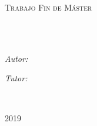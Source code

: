 \documentclass[
11pt, %
spanish,
singlespacing, %
headsepline, %
]{MastersDoctoralThesis} %
\author{\textsc{José María Sánchez Salas}} %
\begin{document}
\nocite{*} %

\frontmatter %

\pagestyle{plain} %


\begin{titlepage}
\begin{center}

\vspace*{.06\textheight}
{\scshape\LARGE \univname\par}\vspace{1cm} %
\vspace{10mm}%
{\scshape\huge \degreename\par} \vspace{0.5cm} %
\textsc{\LARGE Trabajo Fin de Máster}\\[0.5cm] %

\vspace{10mm}
\HRule \\[0.4cm] %
{\huge \bfseries \ttitle\par}\vspace{0.4cm} %
\HRule \\[1.5cm] %
 
\begin{minipage}[t]{0.4\textwidth}
\begin{flushleft} \large
\emph{Autor:}\\
\authorname %
\end{flushleft}
\end{minipage}
\begin{minipage}[t]{0.5\textwidth}
\begin{flushright} \large
\emph{Tutor:} \\
\supname %
\end{flushright}
\end{minipage}\\[2cm]
 
\vfill

{\large \textsc{2019}}\\[4cm] %
 
\vfill
\end{center}
\end{titlepage}
\end{document}
